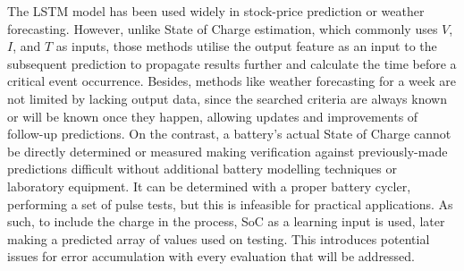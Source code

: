 %
%
The LSTM model has been used widely in stock-price prediction or weather forecasting. 
However, unlike State of Charge estimation, which commonly uses $V$, $I$, and $T$ as inputs, those methods utilise the output feature as an input to the subsequent prediction to propagate results further and calculate the time before a critical event occurrence.
Besides, methods like weather forecasting for a week are not limited by lacking output data, since the searched criteria are always known or will be known once they happen, allowing updates and improvements of follow-up predictions.
On the contrast, a battery's actual State of Charge cannot be directly determined or measured making verification against previously-made predictions difficult without additional battery modelling techniques or laboratory equipment.
It can be determined with a proper battery cycler, performing a set of pulse tests, but this is infeasible for practical applications.
As such, to include the charge in the process, SoC as a learning input is used, later making a predicted array of values used on testing.
This introduces potential issues for error accumulation with every evaluation that will be addressed.

